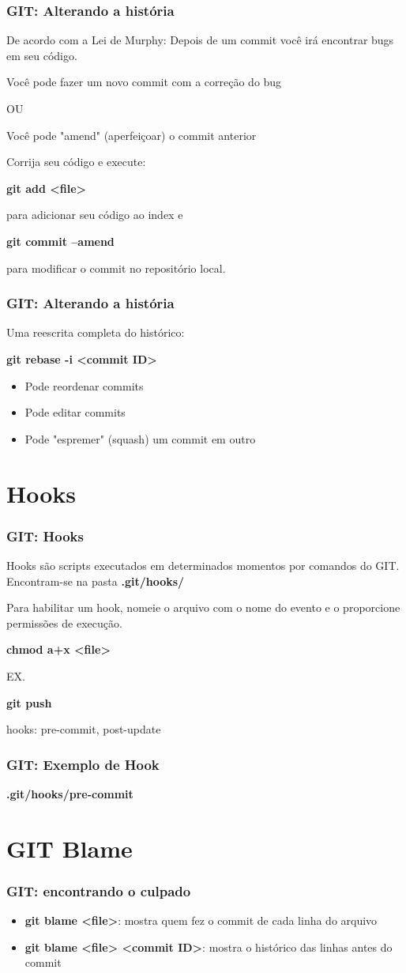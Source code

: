 \documentclass{beamer}
\begin{document}
\begin{frame}
\frametitle{GIT: Alterando a história}

De acordo com a Lei de Murphy: Depois de um commit você irá encontrar bugs em seu código.

Você pode fazer um novo commit com a correção do bug

OU 

Você pode "amend" (aperfeiçoar) o commit anterior

Corrija seu código e execute:

\textbf{git add <file>}

para adicionar seu código ao index e

\textbf{git commit --amend}

para modificar o commit no repositório local.
\end{frame}


\begin{frame}
\frametitle{GIT: Alterando a história}

Uma reescrita completa do histórico:

\textbf{git rebase -i <commit ID>}

\begin{itemize}
\item Pode reordenar commits
\item Pode editar commits
\item Pode "espremer" (squash) um commit em outro
\end{itemize}


\end{frame}

\section{Hooks}
\begin{frame}
\frametitle{GIT: Hooks}

Hooks são scripts executados em determinados momentos por comandos do GIT. Encontram-se na pasta \textbf{.git/hooks/}

Para habilitar um hook, nomeie o arquivo com o nome do evento e o proporcione permissões de execução.

\textbf{chmod a+x <file>}

EX.

\textbf{git push}

hooks: pre-commit, post-update
\end{frame}

\begin{frame}
\frametitle{GIT: Exemplo de Hook}

\textbf{.git/hooks/pre-commit}

\end{frame}

\section{GIT Blame}
\begin{frame}
\frametitle{GIT: encontrando o culpado}


\begin{itemize}
\item \textbf{git blame <file>}: mostra quem fez o commit de cada linha do arquivo
\item \textbf{git blame <file> <commit ID>}: mostra o histórico das linhas antes do commit
\end{itemize}


\end{frame}
\end{document}
